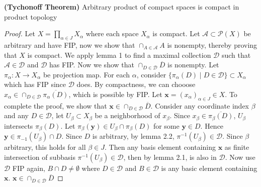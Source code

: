 \documentclass[10.5pt]{article}
\newcommand{\calA}{\mathcal{A}}
\newcommand{\calD}{\mathcal{D}}
\newcommand{\calP}{\mathcal{P}}
\newcommand{\bx}{\mathbf{x}}
\newcommand{\by}{\mathbf{y}}
\begin{document}
\begin{theorem*}
    \textbf{(Tychonoff Theorem)} Arbitrary product of compact spaces is compact in product topology
    \begin{proof}
        Let $X = \textstyle \prod_{\alpha\in J} X_{\alpha}$ where each space $X_{\alpha}$ is compact. Let $\calA\subset\calP(X)$ be arbitrary and have FIP, now we show that $\cap_{A\in\calA} A$ is nonempty, thereby proving that $X$ is compact. We apply lemma 1 to find a maximal collection $\calD$ such that $\calA\in\calD$ and $\calD$ has FIP. Now we show that $\cap_{D\in\calD} \overline{D}$ is nonempty. Let $\pi_{\alpha}: X\to X_{\alpha}$ be projection map. For each $\alpha$, consider $\{\pi_{\alpha}(D) \mid D\in\calD \} \subset X_{\alpha}$ which has FIP since $\calD$ does. By compactness, we can chooose $x_{\alpha} \in \cap_{D\in\calD} \overline{\pi_{\alpha}(D)}$, which is possible by FIP. Let $\bx = (x_{\alpha})_{\alpha\in J} \in X$. To complete the proof, we show that $\bx \in \cap_{D\in\calD} \overline{D}$. Consider any coordinate index $\beta$ and any $D\in\calD$, let $U_{\beta} \subset X_{\beta}$ be a neighborhood of $x_{\beta}$. Since $x_{\beta} \in \overline{\pi_{\beta}(D)}$, $U_{\beta}$ intersects $\pi_{\beta}(D)$. Let $\pi_{\beta}(\by) \in U_{\beta} \cap \pi_{\beta}(D)$ for some $\by \in D$. Hence $\by \in \pi_{-1}(U_{\beta}) \cap D$. Since $D$ is arbitrary, by lemma 2.2, $\pi^{-1}(U_{\beta}) \in\calD$. Since $\beta$ arbitrary, this holds for all $\beta\in J$. Then any basis element containing $\bx$ as finite intersection of subbasis $\pi^{-1}(U_{\beta}) \in\calD$, then by lemma 2.1, is also in $\calD$. Now use $\calD$ FIP again, $B\cap D \neq \emptyset$ where $D\in\calD$ and $B\in\calD$ is any basic element containing $\bx$. $\bx \in \cap_{D\in\calD} \overline{D}$
    \end{proof}
\end{theorem*}
\end{document}
